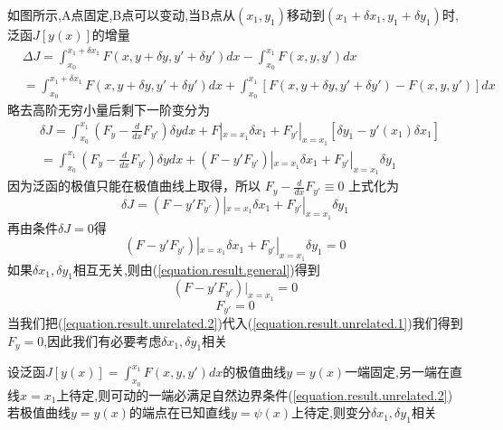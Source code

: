 \documentclass{article}
\begin{document}
如图所示,A点固定,B点可以变动,当B点从$(x_1,y_1)$移动到$(x_1+\delta x_1,y_1+\delta y_1)$时,泛函$ J[y(x)]$的增量
\begin{equation}
     \begin{split}
         & \Delta J=\int_{x_0}^{x_1+\delta x_1}F(x,y+\delta y,y'+\delta y')dx-\int_{x_0}^{x_1}F(x,y,y')dx\\
         & =\int_{x_0}^{x_1+\delta x_1}F(x,y+\delta y,y'+\delta y')dx+\int_{x_0}^{x_1}[F(x,y+\delta y,y'+\delta y')-F(x,y,y')]dx
     \end{split}
\end{equation}
略去高阶无穷小量后剩下一阶变分为
\begin{equation}
\begin{split}
     &  \delta J=\int_{x_0}^{x_1}(F_y - \frac{d}{dx}F_{y'} )\delta y dx + F|_{x=x_1}\delta x_1 + F_{y'}|_{x=x_1}[\delta y_1 - y'(x_1)\delta x_1] \\
    & =\int_{x_0}^{x_1}(F_y - \frac{d}{dx}F_{y'} )\delta y dx + (F-y'F_{y'})|_{x=x_1}\delta x_1 +F_{y'}|_{x=x_1}\delta y_1
\end{split}
\end{equation}
因为泛函的极值只能在极值曲线上取得，所以
$F_y - \frac{d}{dx}F_{y'} \equiv0$
上式化为
\begin{equation}
     \delta J=(F-y'F_{y'})|_{x=x_1}\delta x_1 +F_{y'}|_{x=x_1}\delta y_1
\end{equation}
再由条件$\delta J=0$得
\begin{equation}
     (F-y'F_{y'})|_{x=x_1}\delta x_1 +F_{y'}|_{x=x_1}\delta y_1=0
     \label{equation.result.general}
\end{equation}
如果$\delta x_1,\delta y_1$相互无关,则由(\ref{equation.result.general})得到
\begin{equation}
(F-y'F_{y'})|_{x=x_1}=0
\label{equation.result.unrelated.1}
\end{equation}
\begin{equation}
F_{y'}=0
\label{equation.result.unrelated.2}
\end{equation}
当我们把(\ref{equation.result.unrelated.2})代入(\ref{equation.result.unrelated.1})我们得到$F_y=0$,因此我们有必要考虑$\delta x_1,\delta y_1$相关
\begin{theorem}
设泛函$J[y(x)]=\int_{x_0}^{x_1}F(x,y,y')dx$的极值曲线$y=y(x)$一端固定,另一端在直线$x=x_1$上待定,则可动的一端必满足自然边界条件(\ref{equation.result.unrelated.2})
若极值曲线$y=y(x)$的端点在已知直线$y=\psi(x)$上待定,则变分$\delta x_1,\delta y_1$相关
\end{theorem}
\end{document}
